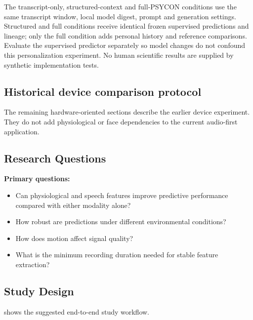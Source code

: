 The transcript-only, structured-context and full-PSYCON conditions use the same transcript window, local model digest, prompt and generation settings. Structured and full conditions receive identical frozen supervised predictions and lineage; only the full condition adds personal history and reference comparisons. Evaluate the supervised predictor separately so model changes do not confound this personalization experiment. No human scientific results are supplied by synthetic implementation tests.

\subsection{Historical device comparison protocol}

The remaining hardware-oriented sections describe the earlier device experiment. They do not add physiological or face dependencies to the current audio-first application.

\subsection{Research Questions}
\label{sec:research-questions}

\textbf{Primary questions:}
\begin{itemize}
    \item Can physiological and speech features improve predictive performance compared with either modality alone?
    \item How robust are predictions under different environmental conditions?
    \item How does motion affect signal quality?
    \item What is the minimum recording duration needed for stable feature extraction?
\end{itemize}

\subsection{Study Design}
\label{sec:study-design}

 shows the suggested end-to-end study workflow.

